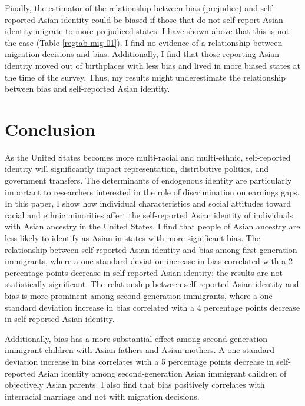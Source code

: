 Finally, the estimator of the relationship between bias (prejudice) and self-reported Asian identity could be biased if those that do not self-report Asian identity migrate to more prejudiced states. I have shown above that this is not the case (Table \ref{regtab-mig-01}). I find no evidence of a relationship between migration decisions and bias. Additionally, I find that those reporting Asian identity moved out of birthplaces with less bias and lived in more biased states at the time of the survey. Thus, my results might underestimate the relationship between bias and self-reported Asian identity.

\section{Conclusion}\label{sec:conc}

As the United States becomes more multi-racial and multi-ethnic, self-reported identity will significantly impact representation, distributive politics, and government transfers. The determinants of endogenous identity are particularly important to researchers interested in the role of discrimination on earnings gaps. In this paper, I show how individual characteristics and social attitudes toward racial and ethnic minorities affect the self-reported Asian identity of individuals with Asian ancestry in the United States. I find that people of Asian ancestry are less likely to identify as Asian in states with more significant bias. The relationship between self-reported Asian identity and bias among first-generation immigrants, where a one standard deviation increase in bias correlated with a 2 percentage points decrease in self-reported Asian identity; the results are not statistically significant. The relationship between self-reported Asian identity and bias is more prominent among second-generation immigrants, where a one standard deviation increase in bias correlated with a 4 percentage points decrease in self-reported Asian identity. 

Additionally, bias has a more substantial effect among second-generation immigrant children with Asian fathers and Asian mothers. A one standard deviation increase in bias correlates with a 5 percentage points decrease in self-reported Asian identity among second-generation Asian immigrant children of objectively Asian parents. I also find that bias positively correlates with interracial marriage and not with migration decisions.

